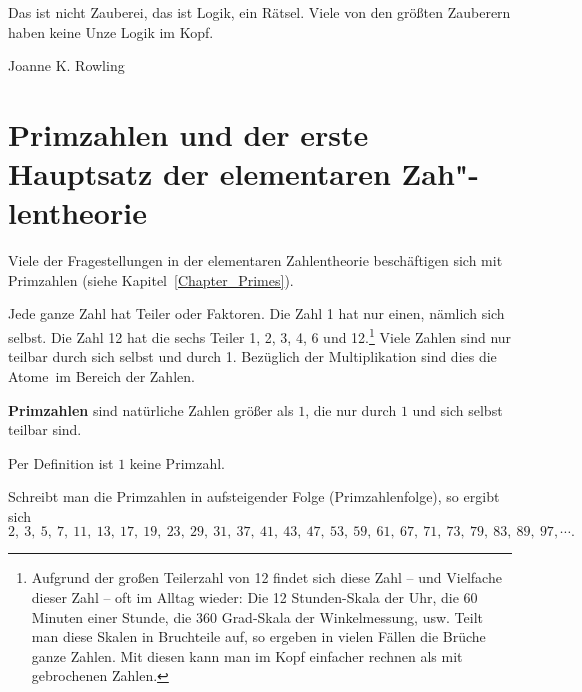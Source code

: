 \begin{refsegment}
\newpage
\begin{ctsquote}
Das ist nicht Zauberei, das ist Logik, ein Rätsel.
Viele von den größten Zauberern haben keine Unze Logik im Kopf.
\caption[Joanne K. Rowling]{Joanne K. Rowling\footnotemark}
\end{ctsquote}
\addtocounter{footnote}{0}


\section[Primzahlen und der erste Hauptsatz der elementaren Zahlentheorie]
        {Primzahlen und der erste Hauptsatz der elementaren Zah"-lentheorie}
Viele der Fragestellungen in der elementaren Zahlentheorie beschäftigen sich
mit Primzahlen (siehe Kapitel~\ref{Chapter_Primes}).

Jede ganze Zahl hat Teiler oder Faktoren. Die Zahl 1 hat nur einen, nämlich
sich selbst. Die Zahl 12 hat die sechs Teiler 1, 2, 3, 4, 6 und 12.\footnote{%
  Aufgrund der großen Teilerzahl von 12 findet sich diese Zahl -- und Vielfache
  dieser Zahl -- oft im Alltag wieder:
  Die 12 Stunden-Skala der Uhr, die 60 Minuten einer Stunde, die 360 Grad-Skala
  der Winkelmessung, usw. Teilt man diese Skalen in Bruchteile auf, so ergeben
  in vielen Fällen die Brüche ganze Zahlen. Mit diesen kann
  man im Kopf einfacher rechnen als mit gebrochenen Zahlen.
}
Viele Zahlen sind nur teilbar durch sich selbst und durch 1. Bezüglich der
Multiplikation sind dies die \glqq Atome\grqq~im Bereich der Zahlen.

\begin{definition}\label{def-zth-prime}
\textbf{Primzahlen} sind natürliche Zahlen größer als $1$, die nur durch $1$ und sich
selbst teilbar sind.
\end{definition}

Per Definition ist $1$ keine Primzahl.

Schreibt man die Primzahlen in aufsteigender Folge (Primzahlenfolge), so
ergibt sich
$$2,~ 3,~ 5,~ 7,~ 11, ~13,~ 17,~ 19, ~23, ~29, ~31, ~37,~ 41,~ 43,~ 47,~ 53, ~59, ~61, ~67, ~71,
~73, ~79, ~83, ~89, ~97, \cdots.$$


\end{refsegment}
